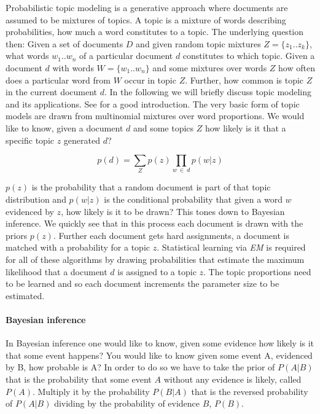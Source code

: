         Probabilistic topic modeling is a generative approach where documents are assumed to be mixtures of topics. A topic is a mixture of words describing probabilities, how much a word constitutes to a topic. The underlying question then: Given a set of documents $D$ and given random topic mixtures $Z=\{z_1..z_k\}$, what words $w_1..w_n$ of a particular document $d$ constitutes to which topic. Given a document $d$ with words $W=\{w_1..w_n\}$ and some mixtures over words $Z$ how often does a particular word from $W$ occur in topic $Z$. Further, how common is topic $Z$ in the current document $d$. In the following we will briefly discuss topic modeling and its applications. See \cite{TopicModelsBlei2012} for a good introduction. The very basic form of topic models are drawn from multinomial mixtures over word proportions. We would like to know, given a document $d$ and some topics $Z$ how likely is it that a specific topic $z$ generated $d$?

          \begin{equation}
            p(d) = \sum_{Z} p(z) \prod_{w\:\in\:d}p(w|z)
          \end{equation}

        $p(z)$ is the probability that a random document is part of that topic distribution and $p(w|z)$ is the conditional probability that given a word $w$ evidenced by $z$, how likely is it to be drawn? This tones down to Bayesian inference. We quickly see that in this process each document is drawn with the priors $p(z)$. Further each document gets hard assignments, a document is matched with a probability for a topic $z$. Statistical learning via \emph{EM} is required for all of these algorithms by drawing probabilities that estimate the maximum likelihood that a document $d$ is assigned to a topic $z$. The topic proportions need to be learned and so each document increments the parameter size to be estimated.

        \paragraph{Bayesian inference}
          In Bayesian inference one would like to know, given some evidence how likely is it that some event happens? You would like to know given some event A, evidenced by B, how probable is A? In order to do so we have to take the prior of $P(A|B)$ that is the probability that some event $A$ without any evidence is likely, called $P(A)$. Multiply it by the probability $P(B|A)$ that is the reversed probability of $P(A|B)$ dividing by the probability of evidence $B$, $P(B)$.

